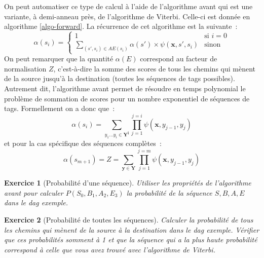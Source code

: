 \documentclass[11pt,openany]{book}
\newtheorem{exo}{Exercice}[chapter]
\newcommand{\ac}[1]{{\sc #1}} %
\begin{document}
On peut automatiser ce type de calcul à l'aide de l'algorithme avant qui est une variante, à demi-anneau près, de l'algorithme de Viterbi. Celle-ci est donnée en algorithme \ref{algo-forward}. La récurrence de cet algorithme est la suivante~: 
\begin{equation}
\label{eq-forward}
\alpha(s_i) = \left\{ 
\begin{array}{ll}
1 & \text{si }  i = 0\\
\sum_{(s',s_i)\in AE(s_i)}  \alpha(s') \times \psi(\mathbf{x},s',s_i)&\text{sinon}
\end{array}
\right.
\end{equation}
On peut remarquer que la quantité $\alpha(E)$ correspond au facteur de normalisation $Z$, c'est-à-dire la somme des scores de tous les chemins qui mènent de la source jusqu'à la destination (toutes les séquences de tags possibles). Autrement dit, l'algorithme avant permet de résoudre en temps polynomial le problème de sommation de scores pour un nombre exponentiel de séquences de tags. Formellement on a donc que~: 
\begin{displaymath}
\alpha(s_i) = \sum_{y_1\ldots y_i \in \mathbf{Y^i}}\prod_{j=1}^{j=i} \psi(\mathbf{x},y_{j-1},y_j)
\end{displaymath}
et pour la cas spécifique des séquences complètes~: 
\begin{displaymath}
\alpha(s_{m+1}) = Z = \sum_{\mathbf{y}\in \mathbf{Y}}\prod_{j=1}^{j=m} \psi(\mathbf{x},y_{j-1},y_j)
\end{displaymath}


\begin{exo}[Probabilité d'une séquence]
Utiliser les propriétés de l'algorithme avant pour 
calculer $P(S_0,B_1,A_2,E_3)$ la probabilité de la séquence $S,B,A,E$ dans le \ac{dag} exemple.
\end{exo}

\begin{exo}[Probabilité de toutes les séquences]
Calculer la probabilité de tous les chemins qui mènent de la source à la destination dans le \ac{dag} exemple. Vérifier que ces probabilités somment à 1 et que la séquence qui a la plus haute probabilité correspond à celle que vous avez trouvé avec l'algorithme de Viterbi.
\end{exo}
\end{document}

